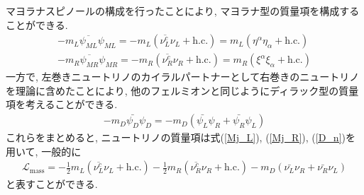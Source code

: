 マヨラナスピノールの構成を行ったことにより, マヨラナ型の質量項を構成することができる.
\begin{eqnarray}
  -m_L \overline{\psi_{ML}}\psi_{ML} = -m_L(\overline{\nu_L^c}\nu_L +\mathrm{h.c.}) = m_L(\eta^\alpha \eta_\alpha + \mathrm{h.c.})\label{Mj_L}\\
  -m_R \overline{\psi_{MR}}\psi_{MR} = -m_R(\overline{\nu_R^c}\nu_R +\mathrm{h.c.}) = m_R(\xi^\alpha \xi_\alpha + \mathrm{h.c.})\label{Mj_R}
\end{eqnarray}
一方で, 左巻きニュートリノのカイラルパートナーとして右巻きのニュートリノを理論に含めたことにより, 他のフェルミオンと同じようにディラック型の質量項を考えることができる.
\begin{eqnarray}
  -m_D\bar{\psi_D}\psi_D = -m_D(\bar{\psi_L}\psi_R + \bar{\psi_R}\psi_L)\label{D_n}
\end{eqnarray}
これらをまとめると, ニュートリノの質量項は式(\ref{Mj_L}), (\ref{Mj_R}), (\ref{D_n})を用いて, 一般的に
\begin{eqnarray}
  \mathcal{L}_{\mathrm{mass}} = -\frac{1}{2}m_L(\overline{\nu_L^c}\nu_L +\mathrm{h.c.}) -\frac{1}{2}m_R(\overline{\nu_R^c}\nu_R +\mathrm{h.c.}) -m_D(\bar{\nu_L}\nu_R + \bar{\nu_R}\nu_L)\label{Lagrangian_nMass}
\end{eqnarray}
と表すことができる.

